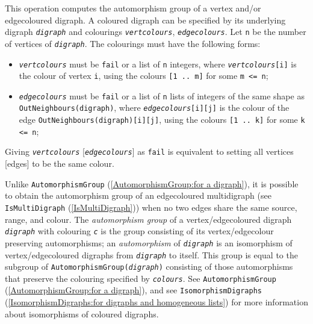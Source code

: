 \documentclass[a4paper,11pt]{report}
\begin{document}
{{{ This operation computes the automorphism group of a vertex\texttt{}
and/or edge\texttt{}coloured digraph. A coloured digraph can be
specified by its underlying digraph \mbox{\texttt{\mdseries\slshape digraph}} and colourings \mbox{\texttt{\mdseries\slshape vert{\textunderscore}colours}}, \mbox{\texttt{\mdseries\slshape edge{\textunderscore}colours}}. Let \texttt{n} be the number of vertices of \mbox{\texttt{\mdseries\slshape digraph}}. The colourings must have the following forms: 
\begin{itemize}
\item  \mbox{\texttt{\mdseries\slshape vert{\textunderscore}colours}} must be \texttt{fail} or a list of \texttt{n} integers, where \mbox{\texttt{\mdseries\slshape vert{\textunderscore}colours}}\texttt{[i]} is the colour of vertex \texttt{i}, using the colours \texttt{[1 .. m]} for some \texttt{m {\textless}= n}; 
\item  \mbox{\texttt{\mdseries\slshape edge{\textunderscore}colours}} must be \texttt{fail} or a list of \texttt{n} lists of integers of the same shape as \texttt{OutNeighbours(digraph)}, where \mbox{\texttt{\mdseries\slshape edge{\textunderscore}colours}}\texttt{[i][j]} is the colour of the edge \texttt{OutNeighbours(digraph)[i][j]}, using the colours \texttt{[1 .. k]} for some \texttt{k {\textless}= n}; 
\end{itemize}
 Giving \mbox{\texttt{\mdseries\slshape vert{\textunderscore}colours}} [\mbox{\texttt{\mdseries\slshape edge{\textunderscore}colours}}] as \texttt{fail} is equivalent to setting all vertices [edges] to be the same colour. 

 Unlike \texttt{AutomorphismGroup} (\ref{AutomorphismGroup:for a digraph}), it is possible to obtain the automorphism group of an
edge\texttt{}coloured multidigraph (see \texttt{IsMultiDigraph} (\ref{IsMultiDigraph})) when no two edges share the same source, range, and colour. The \emph{automorphism group} of a vertex/edge\texttt{}coloured digraph \mbox{\texttt{\mdseries\slshape digraph}} with colouring \mbox{\texttt{\mdseries\slshape c}} is the group consisting of its vertex/edge\texttt{}colour
preserving automorphisms; an \emph{automorphism} of \mbox{\texttt{\mdseries\slshape digraph}} is an isomorphism of vertex/edge\texttt{}coloured digraphs from \mbox{\texttt{\mdseries\slshape digraph}} to itself. This group is equal to the subgroup of \texttt{AutomorphismGroup(\mbox{\texttt{\mdseries\slshape digraph}})} consisting of those automorphisms that preserve the colouring specified by \mbox{\texttt{\mdseries\slshape colours}}. See \texttt{AutomorphismGroup} (\ref{AutomorphismGroup:for a digraph}), and see \texttt{IsomorphismDigraphs} (\ref{IsomorphismDigraphs:for digraphs and homogeneous lists}) for more information about isomorphisms of coloured digraphs. 

}}}
\end{document}
